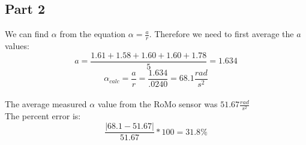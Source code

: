 \documentclass[10pt, letterpaper]{article}
\begin{document}
\subsection{Part 2}
We can find $\alpha $ from the equation $\alpha = \frac{a}{r}$. Therefore we need to first average the $a$ values:
\[ a = \frac{1.61 + 1.58 + 1.60 + 1.60 + 1.78}{5} = 1.634 \]
\[ \alpha _{calc} = \frac{a}{r} = \frac{1.634}{.0240} = 68.1 \frac{rad}{s^2} \] \\

The average measured $\alpha $ value from the RoMo sensor was $51.67 \frac{rad}{s^2}$ \\

The percent error is:
\[ \frac{|68.1 - 51.67|}{51.67}*100 = \boxed{31.8 \%} \]
\end{document}
